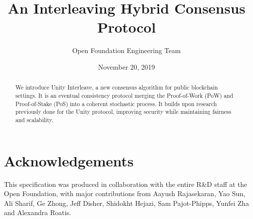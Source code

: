 \documentclass{article}
\title{An Interleaving Hybrid Consensus Protocol}
\author{Open Foundation Engineering Team}
\date{November 20, 2019}
\begin{document}
\maketitle

\begin{abstract}
    We introduce Unity Interleave, a new consensus algorithm for public blockchain settings.
    It is an eventual consistency protocol merging the Proof-of-Work (PoW) and Proof-of-Stake (PoS)
    into a coherent stochastic process. It builds upon research previously done for the Unity
    protocol, improving security while maintaining fairness and scalability.
\end{abstract}

\section*{Acknowledgements}

This specification was produced in collaboration with the entire R\&D staff at the Open Foundation, with major contributions from Aayush Rajasekaran, Yao Sun, Ali Sharif, Ge Zhong, Jeff Disher, Shidokht Hejazi, Sam Pajot-Phipps, Yunfei Zha and Alexandra Roatis.

\newpage
\tableofcontents
\newpage










\pagebreak


\end{document}
